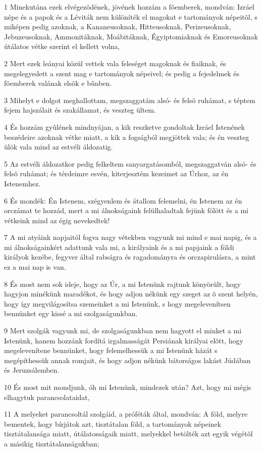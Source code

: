 {\par 1 Minekutána ezek elvégezõdének, jövének hozzám a fõemberek, mondván: Izráel népe és a papok és a Léviták nem különíték el magokat e tartományok népeitõl, s miképen pedig azoknak, a Kananeusoknak, Hitteusoknak, Perizeusoknak, Jebuzeusoknak, Ammonitáknak, Moábitáknak, Égyiptomiaknak és Emoreusoknak útálatos vétke szerint el kellett volna,
\par 2 Mert ezek leányai közül vettek vala feleséget magoknak és fiaiknak, és megelegyedett a szent mag e tartományok népeivel; és pedig a fejedelmek és fõemberek valának elsõk e bûnben.
\par 3 Mihelyt e dolgot meghallottam, megszaggatám alsó- és felsõ ruhámat, s téptem fejem hajszálait és szakállamat, és veszteg ültem.
\par 4 És hozzám gyûlének mindnyájan, a kik reszketve gondoltak Izráel Istenének beszédeire azoknak vétke miatt, a kik a fogságból megjöttek vala; és én veszteg ülök vala mind az estvéli áldozatig.
\par 5 Az estvéli áldozatkor pedig felkeltem sanyargatásomból, megszaggatván alsó- és felsõ ruhámat; és térdeimre esvén, kiterjesztém kezeimet az Úrhoz, az én Istenemhez.
\par 6 És mondék: Én Istenem, szégyenlem és átallom felemelni, én Istenem az én orczámat te hozzád, mert a mi álnokságaink felülhaladtak fejünk fölött és a mi vétkeink mind az égig nevekedtek!
\par 7 A mi atyáink napjaitól fogva nagy vétekben vagyunk mi mind e mai napig, és a mi álnokságainkért adattunk vala mi, a királyaink és a mi papjaink a földi királyok kezébe, fegyver által rabságra és ragadományra és orczapirulásra, a mint ez a mai nap is van.
\par 8 És most nem sok ideje, hogy az Úr, a mi Istenünk rajtunk könyörült, hogy hagyjon minékünk maradékot, és hogy adjon nékünk egy szeget az õ szent helyén, hogy így megvilágosítsa szemeinket a mi Istenünk, s hogy megelevenítsen bennünket egy kissé a mi szolgaságunkban.
\par 9 Mert szolgák vagyunk mi, de szolgaságunkban nem hagyott el minket a mi Istenünk, hanem hozzánk fordítá irgalmasságát Persiának királyai elõtt, hogy megelevenítene bennünket, hogy felemelhessük a mi Istenünk házát s megépíthessük annak romjait, és hogy adjon nékünk bátorságos lakást Júdában és Jeruzsálemben.
\par 10 És most mit mondjunk, óh mi Istenünk, mindezek után? Azt, hogy mi mégis elhagytuk parancsolataidat,
\par 11 A melyeket parancsoltál szolgáid, a próféták által, mondván: A föld, melyre bementek, hogy bírjátok azt, tisztátalan föld, a tartományok népeinek tisztátalansága miatt, útálatosságaik miatt, melyekkel betölték azt egyik végétõl a másikig tisztátalanságukban;
}
